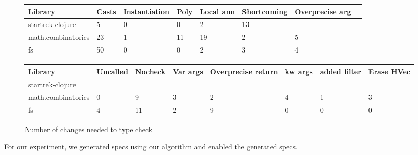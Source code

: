 \begin{figure*}
\begin{tabular}{| l | l | l | l | l | l | l | l |}
  Library            & Casts & Instantiation & Poly & Local ann & Shortcoming & Overprecise arg \\
  \hline
  startrek-clojure   & 5     & 0             & 0    & 2         & 13          &               \\
  math.combinatorics & 23    & 1             & 11   & 19        & 2           & 5             \\
  fs                 & 50    & 0             & 0    & 2         & 3           & 4             \\
\end{tabular}
\begin{tabular}{| l | l | l | l | l | l | l | l |}
  Library            & Uncalled & Nocheck & Var args & Overprecise return & kw args & added filter & Erase HVec\\
  \hline
  startrek-clojure   & & & & & &               & \\
  math.combinatorics & 0        & 9       & 3        & 2                  & 4       & 1            & 3\\
  fs                 & 4        & 11      & 2        & 9                  & 0       & 0            & 0\\
\end{tabular}
\caption{Number of changes needed to type check}
\end{figure*}




For our experiment, we generated specs using our algorithm and enabled
the generated specs.



